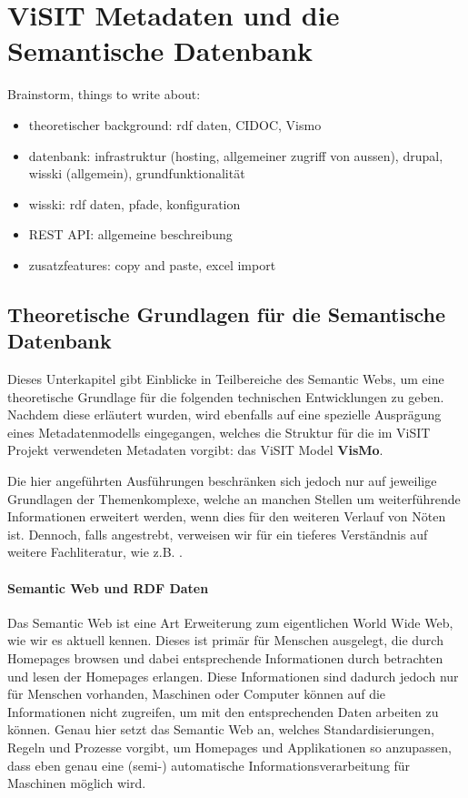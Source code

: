 \section{ViSIT Metadaten und die Semantische Datenbank}\label{sec:semantics}

Brainstorm, things to write about:

\begin{itemize}
	\item theoretischer background: rdf daten, CIDOC, Vismo
	\item datenbank: infrastruktur (hosting, allgemeiner zugriff von aussen), drupal, wisski (allgemein), grundfunktionalität
	\item wisski: rdf daten, pfade, konfiguration
	\item REST API: allgemeine beschreibung
	\item zusatzfeatures: copy and paste, excel import
\end{itemize}

\subsection{Theoretische Grundlagen für die Semantische Datenbank}\label{sec:theoreticalBackground}

Dieses Unterkapitel gibt Einblicke in Teilbereiche des Semantic Webs, um eine theoretische Grundlage für die folgenden technischen Entwicklungen zu geben. Nachdem diese erläutert wurden, wird ebenfalls auf eine spezielle Ausprägung eines Metadatenmodells eingegangen, welches die Struktur für die im ViSIT Projekt verwendeten Metadaten vorgibt: das ViSIT Model \textbf{VisMo}.

Die hier angeführten Ausführungen beschränken sich jedoch nur auf jeweilige Grundlagen der Themenkomplexe, welche an manchen Stellen um weiterführende Informationen erweitert werden, wenn dies für den weiteren Verlauf von Nöten ist. Dennoch, falls angestrebt, verweisen wir für ein tieferes Verständnis auf weitere Fachliteratur, wie z.B. \cite{Hitzler-SemanticWeb-2007}.

\paragraph{Semantic Web und RDF Daten}

Das Semantic Web ist eine Art Erweiterung zum eigentlichen World Wide Web, wie wir es aktuell kennen. Dieses ist primär für Menschen ausgelegt, die durch Homepages browsen und dabei entsprechende Informationen durch betrachten und lesen der Homepages erlangen. Diese Informationen sind dadurch jedoch nur für Menschen vorhanden, Maschinen oder Computer können auf die Informationen nicht zugreifen, um mit den entsprechenden Daten arbeiten zu können. Genau hier setzt das Semantic Web an, welches Standardisierungen, Regeln und Prozesse vorgibt, um Homepages und Applikationen so anzupassen, dass eben genau eine (semi-) automatische Informationsverarbeitung für Maschinen möglich wird.
 
